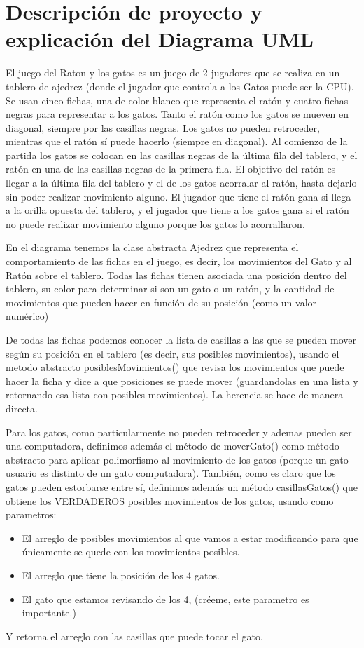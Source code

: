 \documentclass[12pt, Tahoma]{article}
\begin{document}
	\section*{Descripción de proyecto y explicación del Diagrama UML} El juego del Raton y los gatos es un juego de 2 jugadores que se realiza en un tablero de ajedrez (donde el jugador que controla a los Gatos puede ser la CPU). Se usan cinco fichas, una de color blanco que representa el ratón y cuatro fichas negras para representar a los gatos. Tanto el ratón como los gatos se mueven en diagonal, siempre por las casillas negras. Los gatos no pueden retroceder, mientras que el ratón sí puede hacerlo (siempre en diagonal). Al comienzo de la partida los gatos se colocan en las casillas negras de la última fila del tablero, y el ratón en una de las casillas negras de la primera fila. El objetivo del ratón es llegar a la última fila del tablero y el de los gatos acorralar al ratón, hasta dejarlo sin poder realizar movimiento alguno. El jugador que tiene el ratón gana si llega a la orilla opuesta del tablero, y el jugador que tiene a los gatos gana si el ratón no puede realizar movimiento alguno porque los gatos lo acorrallaron.
	
	
	En el diagrama tenemos la clase abstracta Ajedrez que representa el comportamiento de las fichas en el juego, es decir, los movimientos del Gato y al Ratón sobre el tablero.
	Todas las fichas tienen asociada una posición dentro del tablero, su color para determinar si son un gato o un ratón, y la cantidad de movimientos que pueden hacer en función de su posición (como un valor numérico)
	
	
	De todas las fichas podemos conocer la lista de casillas a las que se pueden mover según su posición en el tablero (es decir, sus posibles movimientos), usando el metodo abstracto posiblesMovimientos() que revisa los movimientos que puede hacer la ficha y dice a que posiciones se puede mover (guardandolas en una lista y retornando esa lista con posibles movimientos). La herencia se hace de manera directa.
	
	
	Para los gatos, como particularmente no pueden retroceder y ademas pueden ser una computadora, definimos además el método de moverGato() como método abstracto para aplicar polimorfismo al movimiento de los gatos (porque un gato usuario es distinto de un gato computadora). También, como es claro que los gatos pueden estorbarse entre sí, definimos además un método casillasGatos() que obtiene los VERDADEROS posibles movimientos de los gatos, usando como parametros: 
	\begin{itemize}
		\item El arreglo de posibles movimientos al que vamos a estar modificando para que únicamente se quede con los movimientos posibles.
		\item El arreglo que tiene la posición de los 4 gatos.
		\item El gato que estamos revisando de los 4, (créeme, este parametro es importante.)
	\end{itemize}
	Y retorna el arreglo con las casillas que puede tocar el gato.
	
\end{document}
